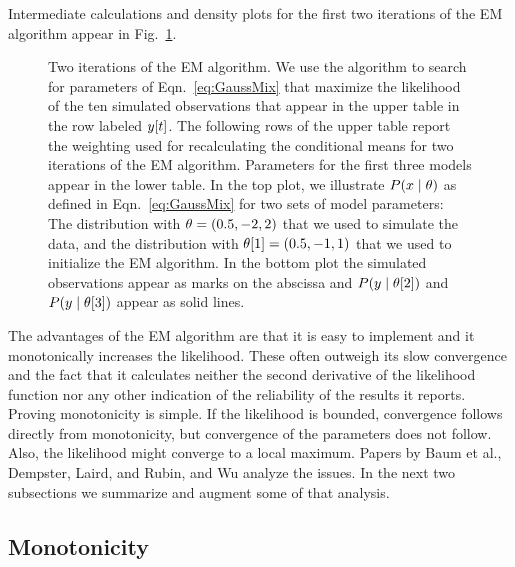 Intermediate calculations and density plots for the first two
iterations of the EM algorithm appear in Fig.~\ref{fig:GaussMix}.

\begin{figure}[htbp]
  \caption[Two iterations of the EM
  algorithm.]%
  {Two iterations of the EM algorithm.  We use the algorithm to search
    for parameters of Eqn.~\eqref{eq:GaussMix} that maximize the
    likelihood of the ten simulated observations that appear in the upper
    table in the row labeled ${y}{[t]}$.  The following rows of the
    upper table report the weighting used for recalculating the
    conditional means for two iterations of the EM algorithm.
    Parameters for the first three models appear in the lower table.
    In the top plot, we illustrate $P(x\mid \theta)$ as defined in
    Eqn.~\eqref{eq:GaussMix} for two sets of model parameters: The
    distribution with $\theta = (0.5, -2, 2)$ that we used to simulate
    the data, and the distribution with
    ${\theta}{[1]} = (0.5, -1, 1)$ that we used to initialize
    the EM algorithm.  In the bottom plot the simulated observations
    appear as marks on the abscissa and $P(y\mid {\theta}{[2]})$ and
    $P(y\mid {\theta}{[3]})$ appear as solid lines.}
  \label{fig:GaussMix}
\end{figure}
\afterpage{\clearpage}%

The advantages of the EM algorithm are that it is easy to implement
and it monotonically increases the likelihood.  These often outweigh
its slow convergence and the fact that it calculates neither the
second derivative of the likelihood function nor any other indication
of the reliability of the results it reports.  Proving monotonicity is
simple.  If the likelihood is bounded, convergence follows directly
from monotonicity, but convergence of the parameters does not follow.
Also, the likelihood might converge to a local maximum.  Papers by
Baum et al.\cite{Baum70}, Dempster, Laird, and Rubin\cite{Dempster77},
and Wu\cite{Wu83} analyze the issues.  In the next two subsections we
summarize and augment some of that analysis.

\subsection{Monotonicity}

